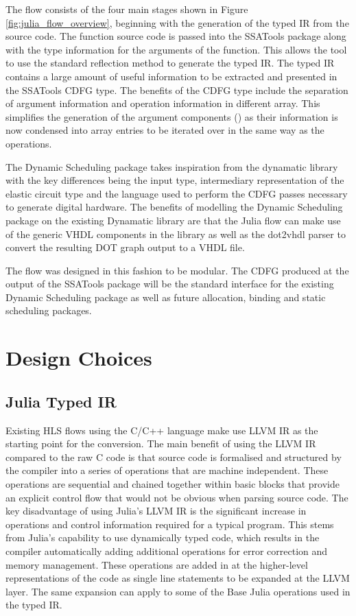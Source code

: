 The flow consists of the four main stages shown in Figure \ref{fig:julia_flow_overview}, beginning with the generation of the typed IR from the source code. The function source code is passed into the SSATools package along with the type information for the arguments of the function. This allows the tool to use the standard reflection method  to generate the typed IR. The typed IR contains a large amount of useful information to be extracted and presented in the SSATools CDFG type. The benefits of the CDFG type include the separation of argument information and operation information in different array. This simplifies the generation of the argument components () as their information is now condensed into array entries to be iterated over in the same way as the operations.

The Dynamic Scheduling package takes inspiration from the dynamatic library \cite{dyn_lib} with the key differences being the input type, intermediary representation of the elastic circuit type and the language used to perform the CDFG passes necessary to generate digital hardware. The benefits of modelling the Dynamic Scheduling package on the existing Dynamatic library are that the Julia flow can make use of the generic VHDL components in the library as well as the dot2vhdl parser to convert the resulting DOT graph output to a VHDL file. 

The flow was designed in this fashion to be modular. The CDFG produced at the output of the SSATools package will be the standard interface for the existing Dynamic Scheduling package as well as future allocation, binding and static scheduling packages.

\section{Design Choices}

\subsection{Julia Typed IR} %
Existing HLS flows using the C/C++ language make use LLVM IR as the starting point for the conversion. The main benefit of using the LLVM IR compared to the raw C code is that source code is formalised and structured by the compiler into a series of operations that are machine independent. These operations are sequential and chained together within basic blocks that provide an explicit control flow that would not be obvious when parsing source code. The key disadvantage of using Julia's LLVM IR is the significant increase in operations and control information required for a typical program. This stems from Julia's capability to use dynamically typed code, which results in the compiler automatically adding additional operations for error correction and memory management. These operations are added in at the higher-level representations of the code as single line statements to be expanded at the LLVM layer. The same expansion can apply to some of the Base Julia operations used in the typed IR. 


